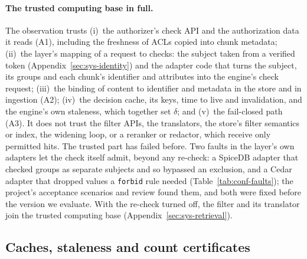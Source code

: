 \paragraph{The trusted computing base in full.}
The observation trusts (i)~the authorizer's check API and the authorization data it reads (A1),
including the freshness of ACLs copied into chunk metadata; (ii)~the layer's mapping of a request to
checks: the subject taken from a verified token (Appendix~\ref{sec:sys-identity}) and the adapter code
that turns the subject, its groups and each chunk's identifier and attributes into the engine's check
request; (iii)~the binding of content to identifier and metadata in the store and in ingestion (A2);
(iv)~the decision cache, its keys, time to live and invalidation, and the engine's own staleness,
which together set $\delta$; and (v)~the fail-closed path (A3). It does not trust the filter APIs, the
translators, the store's filter semantics or index, the widening loop, or a reranker or redactor,
which receive only permitted hits. The trusted part has failed before. Two faults in the layer's own
adapters let the check itself admit, beyond any re-check: a SpiceDB adapter that checked groups as
separate subjects and so bypassed an exclusion, and a Cedar adapter that dropped values a
\texttt{forbid} rule needed (Table~\ref{tab:conf-faults}); the project's acceptance scenarios and
review found them, and both were fixed before the version we evaluate. With the re-check turned off,
the filter and its translator join the trusted computing base (Appendix~\ref{sec:sys-retrieval}).

\subsection{Caches, staleness and count certificates}\label{app:certificates}


